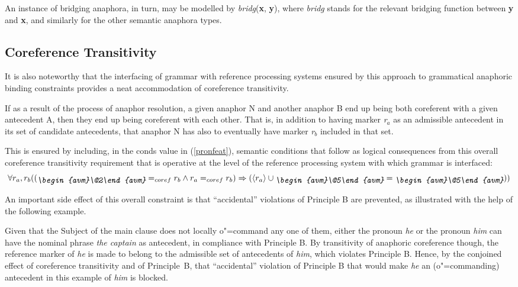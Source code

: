 \documentclass[output=paper
,modfonts
,nonflat]{langsci/langscibook}
\begin{document}
An instance of bridging anaphora, in turn,
may be modelled by {\it bridg}(\textbf{x}, \textbf{y}), where {\it bridg} stands
for the relevant bridging function between \textbf{y} and \textbf{x}, and similarly 
for the other semantic anaphora types.

\subsection{Coreference Transitivity \label{transitivity}}

It is also noteworthy that the interfacing of grammar with reference processing systems
ensured by this approach to grammatical anaphoric binding constraints
provides a neat accommodation of coreference transitivity.

If as a result of the process of anaphor resolution, a given anaphor N and another anaphor B 
end up being both coreferent with a given antecedent A, then they end up being coreferent 
with each other. That is, in addition to having marker \emph{r$_{a}$} as an admissible antecedent
in its set of candidate antecedents, that anaphor N has also to eventually have marker \emph{r$_{b}$} 
included in that set.

This is ensured by including, in the {\sc conds} value in (\ref{pronfeat}), semantic conditions 
that follow as logical consequences from this overall coreference transitivity requirement that
is operative at the level of the reference processing system with which grammar is interfaced:
$$\forall r_{a},r_{b} ((\raisebox{-.6ex}{\em \begin{avm}\@2\end{avm}}=_{coref}r_{b}
\wedge r_{a}=_{coref}r_{b})
\Rightarrow (\langle r_{a}\rangle \cup\raisebox{-.6ex}{\em
\begin{avm}\@5\end{avm}} = \raisebox{-.6ex}{\em
\begin{avm}\@5\end{avm}}))$$


An important side effect of this overall constraint is  that ``accidental''
violations of Principle B are prevented, as illustrated with the help of the following example.

 \begin{exe}
\end{exe}

Given that the Subject of the main clause does not locally o"=command any one of them,
either the pronoun \emph{he} or the pronoun \emph{him} can have the nominal phrase
\emph{the captain} as antecedent, in compliance with Principle B. 
By transitivity of anaphoric coreference though, the reference marker 
of \emph{he} is made to belong to the admissible set of antecedents of \emph{him},
which violates Principle B. Hence, by the conjoined effect
of coreference transitivity and of Principle~B, that ``accidental'' violation
of Principle B that would make \emph{he} an (o"=commanding)
antecedent in this example of \emph{him} is blocked.
\end{document}
